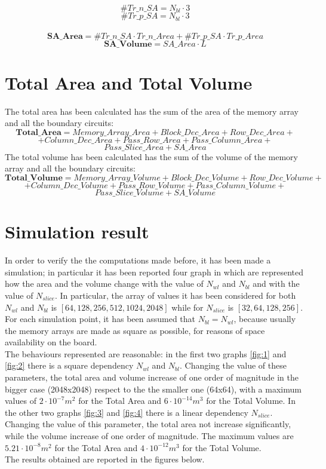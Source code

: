 	\[
	\#Tr\_n\_SA=N_{bl} \cdot 3
	\]
	\[
	\#Tr\_p\_SA=N_{bl} \cdot 3
	\]
	\\
	\[
	\textbf{SA\_Area} = \#Tr\_n\_SA \cdot Tr\_n\_Area + \#Tr\_p\_SA \cdot Tr\_p\_Area
	\]
	\[
	\textbf{SA\_Volume} = SA\_Area \cdot L
	\]

\section{Total Area and Total Volume}
The total area has been calculated has the sum of the area of the memory array and all the boundary circuits:
	\[
	\textbf{Total\_Area}= Memory\_Array\_Area + Block\_Dec\_Area + Row\_Dec\_Area + 
	\]
	\[
	+Column\_Dec\_Area + Pass\_Row\_Area + Pass\_Column\_Area + 
	\]
	\[
	Pass\_Slice\_Area +  SA\_Area
	\]
The total volume has been calculated has the sum of the volume of the memory array and all the boundary circuits:
	\[
	\textbf{Total\_Volume}= Memory\_Array\_Volume + Block\_Dec\_Volume + Row\_Dec\_Volume + 
	\]
	\[
	+Column\_Dec\_Volume + Pass\_Row\_Volume + Pass\_Column\_Volume + 
	\]
	\[
	Pass\_Slice\_Volume +  SA\_Volume
	\]

\section{Simulation result}
In order to verify the the computations made before, it has been made a simulation; in particular it has been reported four graph in which are represented how the area and the volume change with the value of $N_{wl}$ and $N_{bl}$ and with the value of $N_{slice}$. In particular, the array of values it has been considered for both $N_{wl}$ and $N_{bl}$ is $[64, 128, 256, 512, 1024, 2048]$ while for $N_{slice}$ is $[32, 64, 128, 256]$. For each simulation point, it has been assumed that $N_{bl}=N_{wl}$, because usually the memory arrays are made as square as possible, for reasons of space availability on the board.
\\The behaviours represented are reasonable: in the first two graphs \ref{fig:1} and \ref{fig:2} there is a square dependency $N_{wl}$ and $N_{bl}$. Changing the value of these parameters, the total area and volume increase of one order of magnitude in the bigger case (2048x2048) respect to the the smaller one (64x64), with a maximum values of $2\cdot10^{-7}m^{2}$ for the Total Area and $6\cdot10^{-14}m^{3}$ for the Total Volume.
In the other two graphs \ref{fig:3} and \ref{fig:4} there is a linear dependency $N_{slice}$. Changing the value of this parameter, the total area not increase significantly, while the volume increase of one order of magnitude. The maximum values are $5.21\cdot10^{-8}m^{2}$ for the Total Area and $4\cdot10^{-12}m^{3}$ for the Total Volume.
\\The results obtained are reported in the figures below.

